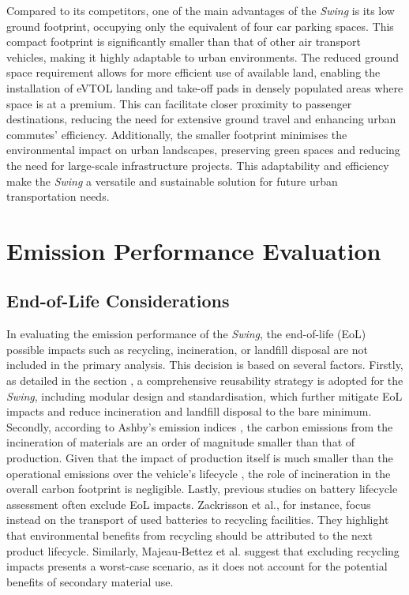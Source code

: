Compared to its competitors, one of the main advantages of the \textit{Swing} is its low ground footprint, occupying only the equivalent of four car parking spaces.
This compact footprint is significantly smaller than that of other air transport vehicles, making it highly adaptable to urban environments.
The reduced ground space requirement allows for more efficient use of available land, enabling the installation of eVTOL landing and take-off pads in densely populated areas where space is at a premium.
This can facilitate closer proximity to passenger destinations, reducing the need for extensive ground travel and enhancing urban commutes’ efficiency.
Additionally, the smaller footprint minimises the environmental impact on urban landscapes, preserving green spaces and reducing the need for large-scale infrastructure projects.
This adaptability and efficiency make the \textit{Swing} a versatile and sustainable solution for future urban transportation needs.



\section{Emission Performance Evaluation}
\label{sec:emissionsevaluation}
\subsection*{End-of-Life Considerations}
In evaluating the emission performance of the \textit{Swing}, the end-of-life (EoL) possible impacts such as recycling,
incineration, or landfill disposal \cite{ashby2012materials} are not included in the primary analysis.
This decision is based on several factors.
Firstly, as detailed in the section , a comprehensive reusability strategy is adopted for the \textit{Swing}, including modular design and standardisation, which further mitigate EoL impacts and reduce incineration and landfill disposal to the bare minimum.
Secondly, according to Ashby’s emission indices \cite{ashby2012materials}, the carbon emissions from the incineration of materials are an order of magnitude smaller than that of production.
Given that the impact of production itself is much smaller than the operational emissions over the vehicle’s lifecycle \cite{andre2019robust}, the role of incineration in the overall carbon footprint is negligible.
Lastly, previous studies on battery lifecycle assessment often exclude EoL impacts.
Zackrisson et al.\cite{zackrisson2010life}, for instance, focus instead on the transport of used batteries to recycling facilities.
They highlight that environmental benefits from recycling should be attributed to the next product lifecycle.
Similarly, Majeau-Bettez et al. \cite{majeau2011life} suggest that excluding recycling impacts presents a worst-case scenario, as it does not account for the potential benefits of secondary material use.

